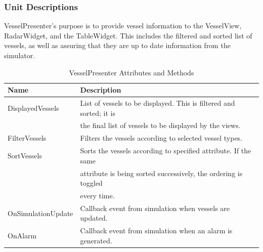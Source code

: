 \documentclass[12pt]{article}
\begin{document}
\subsubsection{Unit Descriptions}
\vspace*{0.2in}
\vspace*{0.15in}
VesselPresenter’s purpose is to provide vessel information to the VesselView, RadarWidget, and the TableWidget. This includes the filtered and sorted list of vessels, as well as assuring that they are up to date information from the simulator.
\begin{table}[ht]
\centering
   \begin{tabular}{|l|l|}
        \hline
        {\large Name} & {\large Description} \\
        \hline\hline
        DisplayedVessels & List of vessels to be displayed. This is filtered and sorted; it is\\
         & the final list of vessels to be displayed by the views.\\
        \hline
        FilterVessels & Filters the vessels according to selected vessel types.\\
        \hline
        SortVessels & Sorts the vessels according to specified attribute. If the same\\
         & attribute is being sorted successively, the ordering is toggled\\
          & every time.\\
        \hline
        OnSimulationUpdate & Callback event from simulation when vessels are updated.\\
        \hline
        OnAlarm & Callback event from simulation when an alarm is generated.\\
        \hline
    \end{tabular}
\caption{VesselPresenter Attributes and Methods}
\end{table}
\end{document}

